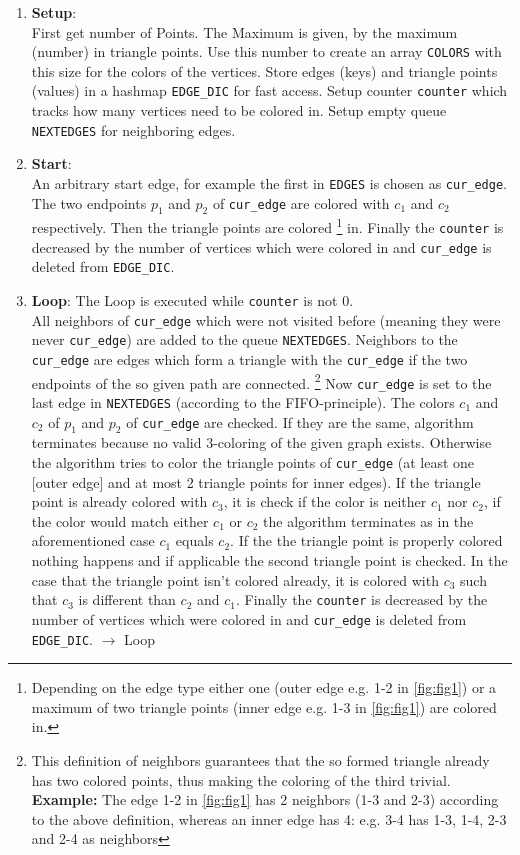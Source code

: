 \documentclass[english]{scrartcl}
\newcommand{\code}{\texttt}
\begin{document}
\begin{enumerate}
    \item \textbf{Setup}:\\ First get number of Points. The Maximum is given, by the maximum (number) in triangle points. Use this number to create an array \code{COLORS} with this size for the colors of the vertices. Store edges (keys) and triangle points (values) in a hashmap \code{EDGE\_DIC} for fast access. Setup counter \code{counter} which tracks how many vertices need to be colored in. Setup empty queue \code{NEXTEDGES} for neighboring edges.
    \item \textbf{Start}:\\ An arbitrary start edge, for example the first in \code{EDGES} is chosen as \code{cur\_edge}. The two endpoints $p_1$ and $p_2$ of \code{cur\_edge} are colored with $c_1$ and $c_2$ respectively. Then the triangle points are colored \footnote{Depending on the edge type either one (outer edge e.g. 1-2 in \autoref{fig:fig1}) or a maximum of two triangle points (inner edge e.g. 1-3 in \autoref{fig:fig1}) are colored in.} in. Finally the \code{counter} is decreased by the number of vertices which were colored in and \code{cur\_edge} is deleted from \code{EDGE\_DIC}.  
    \item \textbf{Loop}: The Loop is executed while \code{counter} is not 0. \\ All neighbors of \code{cur\_edge} which were not visited before (meaning they were never \code{cur\_edge}) are added to the queue \code{NEXTEDGES}. Neighbors to the \code{cur\_edge} are edges which form a triangle with the \code{cur\_edge} if the two endpoints of the so given path are connected. 
    \footnote{This definition of neighbors guarantees that the so formed triangle already has two colored points, thus making the coloring of the third trivial. \\ \textbf{Example:} The edge 1-2 in \autoref{fig:fig1} has 2 neighbors (1-3 and 2-3) according to the above definition, whereas an inner edge has 4: e.g. 3-4 has 1-3, 1-4, 2-3 and 2-4 as neighbors} 
    Now \code{cur\_edge} is set to the last edge in \code{NEXTEDGES} (according to the FIFO-principle). %
    The colors $c_1$ and $c_2$ of $p_1$ and $p_2$ of \code{cur\_edge} are checked. If they are the same, algorithm terminates because no valid 3-coloring of the given graph exists. Otherwise the algorithm tries to color the triangle points of \code{cur\_edge} (at least one [outer edge] and at most 2 triangle points for inner edges). If the triangle point is already colored with $c_3$, it is check if the color is neither $c_1$ nor $c_2$, if the color would match either $c_1$ or $c_2$ the algorithm terminates as in the aforementioned case $c_1$ equals $c_2$. If the the triangle point is properly colored nothing happens and if applicable the second triangle point is checked. In the case that the triangle point isn't colored already, it is colored with $c_3$ such that $c_3$ is different than $c_2$ and $c_1$. Finally the \code{counter} is decreased by the number of vertices which were colored in and \code{cur\_edge} is deleted from \code{EDGE\_DIC}. $\rightarrow$ Loop

\end{enumerate}
\end{document}
